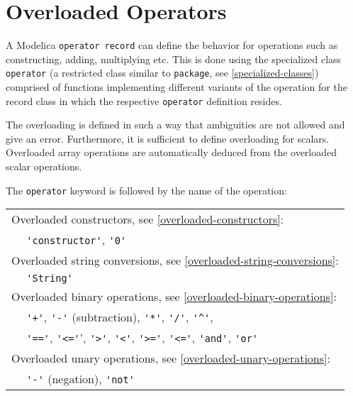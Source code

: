 \chapter{Overloaded Operators}\label{overloaded-operators}

A Modelica \lstinline!operator record! can define the behavior for
operations such as constructing, adding, multiplying etc. This is done
using the specialized class \lstinline!operator! (a restricted class
similar to \lstinline!package!, see \cref{specialized-classes}) comprised of functions
implementing different variants of the operation for the record class in
which the respective \lstinline!operator! definition resides.

\begin{nonnormative}
The overloading is defined in such a way that ambiguities are not allowed and give an error.  Furthermore, it is sufficient to define overloading for scalars.
Overloaded array operations are automatically deduced from the overloaded scalar operations.
\end{nonnormative}

The \lstinline!operator! keyword is followed by the name of the operation:
%
\begin{longtable}[c]{@{}|ll|@{}}
\hline\endhead
\multicolumn{2}{|l|}{Overloaded constructors, see \cref{overloaded-constructors}:}\\
& \lstinline!'constructor'!, \lstinline!'0'!\\
\multicolumn{2}{|l|}{Overloaded string conversions, see \cref{overloaded-string-conversions}:}\\
& \lstinline!'String'! \\
\multicolumn{2}{|l|}{Overloaded binary operations, see \cref{overloaded-binary-operations}:}\\
& \lstinline!'+'!, \lstinline!'-'! (subtraction), \lstinline!'*'!, \lstinline!'/'!, \lstinline!'^'!,\\
& \lstinline!'=='!, \lstinline!'<='!', \lstinline!'>'!, \lstinline!'<'!,
\lstinline!'>='!, \lstinline!'<='!, \lstinline!'and'!, \lstinline!'or'!\\
\multicolumn{2}{|l|}{Overloaded unary operations, see \cref{overloaded-unary-operations}:}\\
& \lstinline!'-'! (negation), \lstinline!'not'!\\
\hline
\end{longtable}

